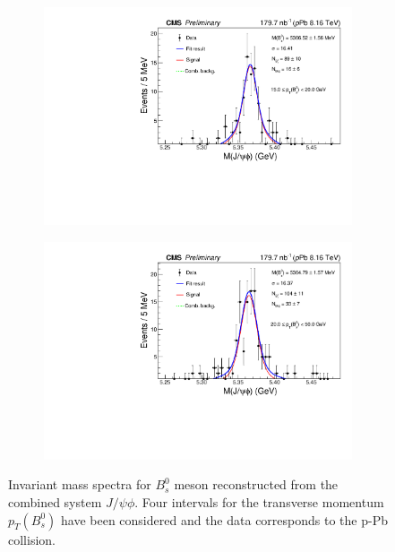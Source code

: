 \begin{figure}[htp!]
\begin{subfigure}[b]{0.475\textwidth}
		\includegraphics[width=\textwidth]{MainContent/Figs/mass/mass_BsFit_ptbins_15_20.PDF}
		\caption{}
	\end{subfigure}
	\hfill
	\begin{subfigure}[b]{0.475\textwidth}
		\centering
		\includegraphics[width=\textwidth]{MainContent/Figs/mass/mass_BsFit_ptbins_20_50.PDF}
		\caption{}%
	\end{subfigure}
	\caption{Invariant mass spectra for $B^0_s$ meson reconstructed from the combined system $J/\psi \phi$. Four intervals for the transverse momentum $p_T(B^0_s)$ have been considered and the data corresponds to the p-Pb collision.}
	\label{fig:mass_ptbins}
	
\end{figure}


